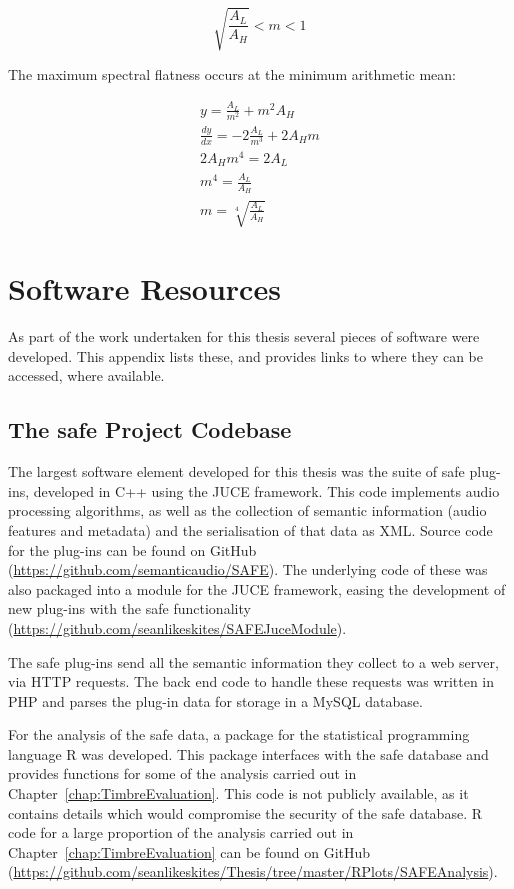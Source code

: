 \begin{appendices}
		\[ \sqrt{\frac{A_{L}}{A_{H}}} < m < 1 \]

		\newpage
		The maximum spectral flatness occurs at the minimum arithmetic mean:

		\begin{gather}
			y = \frac{A_{L}}{m^{2}} + m^{2}A_{H} \nonumber \\[0.6em]
			\frac{dy}{dx} = -2\frac{A_{L}}{m^{3}} + 2A_{H}m \nonumber \\[0.6em]
			2A_{H}m^{4} = 2A_{L} \nonumber \\[0.6em]
			m^{4} = \frac{A_{L}}{A_{H}} \nonumber \\[0.6em]
			m = \sqrt[4]{\frac{A_{L}}{A_{H}}} \nonumber
		\end{gather}

\chapter{Software Resources}
	As part of the work undertaken for this thesis several pieces of software were developed. This appendix lists these,
	and provides links to where they can be accessed, where available.
	
	\section{The \acrshort{safe} Project Codebase}
		The largest software element developed for this thesis was the suite of \acrshort{safe} plug-ins, developed
		in C++ using the JUCE framework. This code implements audio processing algorithms, as well as the collection
		of semantic information (audio features and metadata) and the serialisation of that data as XML. Source code
		for the plug-ins can be found on GitHub
		(\href{https://github.com/semanticaudio/SAFE}{https://github.com/semanticaudio/SAFE}). The underlying code
		of these was also packaged into a module for the JUCE framework, easing the development of new plug-ins with
		the \acrshort{safe} functionality
		(\href{https://github.com/seanlikeskites/SAFEJuceModule}{https://github.com/seanlikeskites/SAFEJuceModule}).

		The \acrshort{safe} plug-ins send all the semantic information they collect to a web server, via HTTP
		requests. The back end code to handle these requests was written in PHP and parses the plug-in data for
		storage in a MySQL database.

		For the analysis of the \acrshort{safe} data, a package for the statistical programming language R was
		developed. This package interfaces with the \acrshort{safe} database and provides functions for some of the
		analysis carried out in Chapter~\ref{chap:TimbreEvaluation}. This code is not publicly available, as it
		contains details which would compromise the security of the \acrshort{safe} database. R code for a large
		proportion of the analysis carried out in Chapter~\ref{chap:TimbreEvaluation} can be found on GitHub
		(\href{https://github.com/seanlikeskites/Thesis/tree/master/RPlots/SAFEAnalysis}
		{https://github.com/seanlikeskites/Thesis/tree/master/RPlots/SAFEAnalysis}).


\end{appendices}
